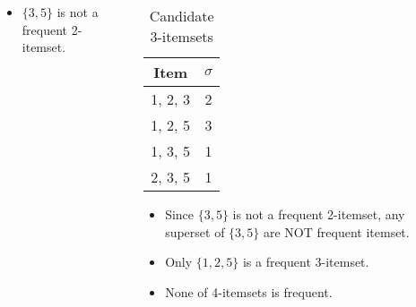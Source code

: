 \documentclass[aspectratio=169, 10pt]{beamer}
\begin{document}
\begin{frame}[t]
\begin{columns}
\begin{column}{0.5\textwidth}
        \begin{itemize}
            \item $\{3, 5\}$ is not a frequent 2-itemset.
        \end{itemize}
    \end{column}
    \begin{column}{0.5\textwidth} %
        \begin{table}[]
            \begin{tabular}{c|c}
                Item                           & $\sigma$            \\ \hline
                {\color[HTML]{FE0000} 1, 2, 3} & {\color[HTML]{FE0000} 2} \\
                1, 2, 5                        & 3                        \\ \hline
                {\color[HTML]{FE0000} 1, 3, 5} & {\color[HTML]{FE0000} 1} \\
                {\color[HTML]{FE0000} 2, 3, 5} & {\color[HTML]{FE0000} 1}
            \end{tabular}
            \caption{Candidate 3-itemsets}
        \end{table}

        \begin{itemize}
            \item Since $\{3, 5\}$ is not a frequent 2-itemset, any superset of $\{3, 5\}$ are NOT frequent itemset.
            \item Only $\{1, 2, 5\}$ is a frequent 3-itemset.
            \item None of 4-itemsets is frequent.
        \end{itemize}
    \end{column}
\end{columns}

\end{frame}
\end{document}
